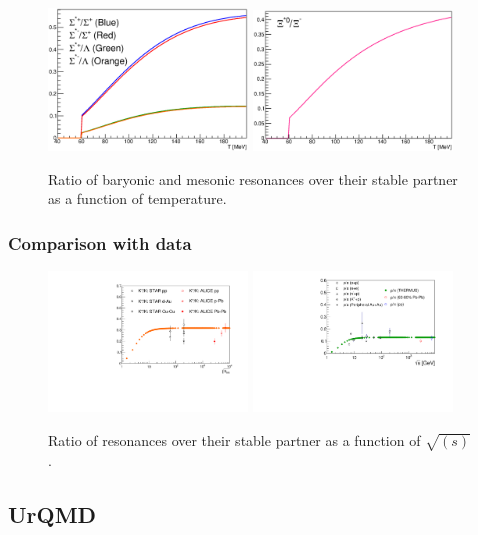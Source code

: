 \begin{figure}[!htbp]
\begin{center}
		\includegraphics[width=200px]{./Version1/FigChapter3/SigmaStarRatio}
		\includegraphics[width=200px]{./Version1/FigChapter3/XiStarToXi}
		\caption{\label{result1} Ratio of baryonic and mesonic resonances over their stable partner as a function of temperature.}
	\end{center}\hspace{2pc}%
\end{figure}

\newpage

\subsubsection{Comparison with data}

\begin{figure}[!htbp]
\begin{center}
	\includegraphics[width=200px]{./Version1/FigChapter3/Kstar_sqrt_s.pdf}
	\includegraphics[width=200px]{./Version1/FigChapter3/RhoToPion_sqrt_s.pdf}
	\caption{\label{result2} Ratio of resonances over their stable partner as a function of $\sqrt{(s)}$.}
\end{center}\hspace{2pc}%
\end{figure}



\subsection{UrQMD}